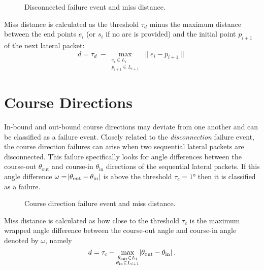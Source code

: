 \begin{figure}[!ht]
\centering
\resizebox{0.6\columnwidth}{!}{}
\caption{Disconnected failure event and miss distance.}
\label{fig:disconnection}
\end{figure}

Miss distance is calculated as the threshold $\tau_d$ minus the maximum distance between the end points $e_i$ (or $s_i$ if no arc is provided) and the initial point $p_{i+1}$ of the next lateral packet:
\begin{equation*}
    d = \tau_d \; - \max\limits_{\substack{e_i \in L_i\\p_{i+1} \in L_{i+1}}}\lVert e_i - p_{i+1} \rVert
\end{equation*}

\section{Course Directions}
In-bound and out-bound course directions may deviate from one another and can be classified as a failure event.
Closely related to the \textit{disconnection} failure event, the course direction failures can arise when two sequential lateral packets are disconnected. This failure specifically looks for angle differences between the course-out $\theta_{\text{out}}$ and course-in $\theta_\text{in}$ directions of the sequential lateral packets. If this angle difference $\omega = \abs{\theta_\text{out} - \theta_\text{in}}$ is above the threshold $\tau_c = 1\si{\degree}$ then it is classified as a failure.

\begin{figure}[!ht]
\centering
\resizebox{0.6\columnwidth}{!}{}
\caption{Course direction failure event and miss distance.}
\label{fig:course_direction}
\end{figure}

Miss distance is calculated as how close to the threshold $\tau_c$ is the maximum wrapped angle difference between the course-out angle and course-in angle denoted by $\omega$, namely
\begin{equation*}
    d = \tau_c - \max\limits_{\substack{\theta_\text{out} \in L_i\\\theta_\text{in} \in L_{i+1}}}\abs{\theta_\text{out} - \theta_\text{in}}.
\end{equation*}

